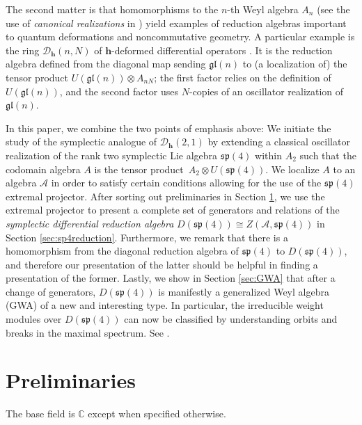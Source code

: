 \documentclass[pdftex]{sigma}
\numberwithin{equation}{section}
\begin{document}
The second matter is that homomorphisms to the $n$-th Weyl algebra $A_{n}$ (see the use of \emph{canonical realizations} in \cite[Definition 1]{havlicekCanonicalRealizationsLie1975}) yield examples of reduction algebras important to quantum deformations and noncommutative geometry. A particular example is the ring $\mathcal{D}_{\mathbf{h}}(n,N)$ of $\mathbf{h}$-deformed differential operators \cite{herlemontDifferentialCalculusMathbf2017}. It is the reduction algebra defined from the diagonal map sending $\mathfrak{gl}(n)$ to (a localization of) the tensor product $U(\mathfrak{gl}(n)) \otimes A_{nN}$; the first factor relies on the definition of $U(\mathfrak{gl}(n))$, and the second factor uses $N$-copies of an oscillator realization of~$\mathfrak{gl}(n)$.

In this paper, we combine the two points of emphasis above: We initiate the study of the symplectic analogue of $\mathcal{D}_{\mathbf{h}}(2,1)$ by extending a classical oscillator realization of the rank two symplectic Lie algebra $\mathfrak{sp}(4)$ within $A_{2}$ such that the codomain algebra $A$ is the tensor product~${A_2\otimes U(\mathfrak{sp}(4))}$. We localize $A$ to an algebra $\mathscr{A}$ in order to satisfy certain conditions allowing for the use of the $\mathfrak{sp}(4)$ extremal projector.
After sorting out preliminaries in Section \ref{sec:PreliminariesRedAlg}, we use the extremal projector to present a complete set of generators and relations of the \emph{symplectic differential reduction algebra} $D(\mathfrak{sp}(4)) \cong Z(\mathscr{A},\mathfrak{sp}(4))$ in Section \ref{sec:sp4reduction}. Furthermore, we remark that there is a homomorphism from the diagonal reduction algebra of $\mathfrak{sp}(4)$ to $D(\mathfrak{sp}(4))$, and therefore our presentation of the latter should be helpful in finding a presentation of the former.
Lastly, we show in Section \ref{sec:GWA} that after a change of generators, $D(\mathfrak{sp}(4))$ is manifestly a generalized Weyl algebra (GWA) of a new and interesting type. In particular, the irreducible weight modules over $D(\mathfrak{sp}(4))$ can now be classified by understanding orbits and breaks in the maximal spectrum. See \cite{bavula1992generalized,hartwigNoncommutativeFiberProducts2018,mazorchukAssociativeAlgebrasRelated2003}.

\section{Preliminaries}\label{sec:PreliminariesRedAlg}
The base field is $\mathbb{C}$ except when specified otherwise.
\end{document}
